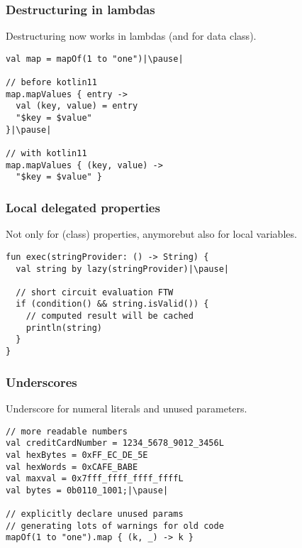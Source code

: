 
\begin{frame}[fragile] \frametitle{Destructuring in lambdas}
Destructuring now works in lambdas (and for data class).
\begin{lstlisting}
val map = mapOf(1 to "one")|\pause|

// before kotlin11
map.mapValues { entry ->
  val (key, value) = entry
  "$key = $value"
}|\pause|

// with kotlin11
map.mapValues { (key, value) -> 
  "$key = $value" }
\end{lstlisting}
\end{frame}


\begin{frame}[fragile] \frametitle{Local delegated properties}
Not only for (class) properties, anymorebut also for local variables.
\begin{lstlisting}
fun exec(stringProvider: () -> String) {
  val string by lazy(stringProvider)|\pause|
  
  // short circuit evaluation FTW
  if (condition() && string.isValid()) {
    // computed result will be cached
    println(string)
  }
}
\end{lstlisting}
\end{frame}


\begin{frame}[fragile] \frametitle{Underscores}
Underscore for numeral literals and unused parameters.  %
\begin{lstlisting}
// more readable numbers
val creditCardNumber = 1234_5678_9012_3456L
val hexBytes = 0xFF_EC_DE_5E
val hexWords = 0xCAFE_BABE
val maxval = 0x7fff_ffff_ffff_ffffL
val bytes = 0b0110_1001;|\pause|

// explicitly declare unused params
// generating lots of warnings for old code
mapOf(1 to "one").map { (k, _) -> k }
\end{lstlisting}
\end{frame}

